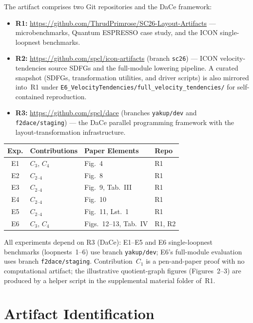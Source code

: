 \documentclass[conference]{IEEEtran}
\begin{document}
The artifact comprises two Git repositories and the DaCe framework:
\begin{itemize}
\item \textbf{R1:} \url{https://github.com/ThrudPrimrose/SC26-Layout-Artifacts} --- microbenchmarks, Quantum ESPRESSO case study, and the ICON single-loopnest benchmarks.
\item \textbf{R2:} \url{https://github.com/spcl/icon-artifacts} (branch \texttt{sc26}) --- ICON velocity-tendencies source SDFGs and the full-module lowering pipeline. A curated snapshot (SDFGs, transformation utilities, and driver scripts) is also mirrored into~R1 under \texttt{E6\_VelocityTendencies/full\_velocity\_tendencies/} for self-contained reproduction.
\item \textbf{R3:} \url{https://github.com/spcl/dace} (branches \texttt{yakup/dev} and \texttt{f2dace/staging}) --- the DaCe parallel programming framework with the layout-transformation infrastructure.
\end{itemize}

\begin{center}
\small
\begin{tabular}{clll}
\toprule
Exp. & Contributions & Paper Elements & Repo \\
\midrule
E1 & $C_3$, $C_4$         & Fig.~4             & R1 \\
E2 & $C_{2\text{--}4}$    & Fig.~8             & R1 \\
E3 & $C_{2\text{--}4}$    & Fig.~9, Tab.~III   & R1 \\
E4 & $C_{2\text{--}4}$    & Fig.~10            & R1 \\
E5 & $C_{2\text{--}4}$    & Fig.~11, Lst.~1    & R1 \\
E6 & $C_3$, $C_4$         & Figs.~12--13, Tab.~IV & R1, R2 \\
\bottomrule
\end{tabular}
\end{center}

All experiments depend on R3 (DaCe): E1--E5 and E6 single-loopnest benchmarks (loopnests~1--6) use branch \texttt{yakup/dev}; E6's full-module evaluation uses branch \texttt{f2dace/staging}.
Contribution~$C_1$ is a pen-and-paper proof with no computational artifact; the illustrative quotient-graph figures (Figures~2--3) are produced by a helper script in the supplemental material folder of~R1.

\section{Artifact Identification}
\end{document}
